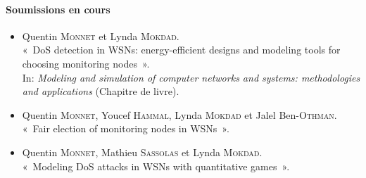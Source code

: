 \paragraph{Soumissions en cours}
\begin{itemize}
    \item Quentin \textsc{Monnet} et Lynda \textsc{Mokdad}.\\
    « DoS detection in WSNs: energy-efficient designs and modeling tools for choosing monitoring nodes ».\\
    In: \textit{Modeling and simulation of computer networks and systems: methodologies and applications} (Chapitre de livre).

    \item Quentin \textsc{Monnet}, Youcef \textsc{Hammal}, Lynda \textsc{Mokdad} et Jalel Ben-\textsc{Othman}.\\
    « Fair election of monitoring nodes in WSNs ».

    \item Quentin \textsc{Monnet}, Mathieu \textsc{Sassolas} et Lynda \textsc{Mokdad}.\\
    « Modeling DoS attacks in WSNs with quantitative games ».
\end{itemize}




